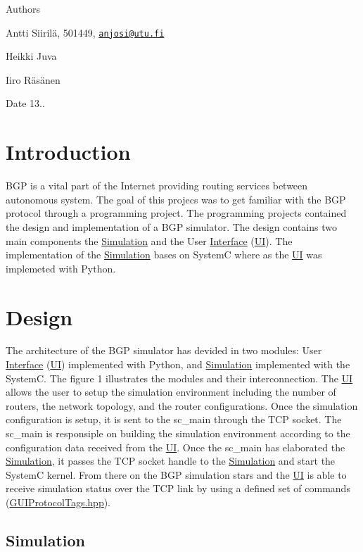 \begin{DoxyAuthor}{Authors}
\begin{DoxyItemize}
\item Antti Siirilä, 501449, \href{mailto:anjosi@utu.fi}{\tt anjosi@utu.\-fi}\item Heikki Juva\item Iiro Räsänen \end{DoxyItemize}

\end{DoxyAuthor}
\begin{DoxyDate}{Date}
13.. 
\end{DoxyDate}
\hypertarget{index_s_intro}{}\section{Introduction}\label{index_s_intro}
B\-G\-P is a vital part of the Internet providing routing services between autonomous system. The goal of this projecs was to get familiar with the B\-G\-P protocol through a programming project. The programming projects contained the design and implementation of a B\-G\-P simulator. The design contains two main components the \hyperlink{classSimulation}{Simulation} and the User \hyperlink{classInterface}{Interface} (\hyperlink{namespaceUI}{U\-I}). The implementation of the \hyperlink{classSimulation}{Simulation} bases on System\-C where as the \hyperlink{namespaceUI}{U\-I} was implemeted with Python. \hypertarget{index_s_design}{}\section{Design}\label{index_s_design}
The architecture of the B\-G\-P simulator has devided in two modules\-: User \hyperlink{classInterface}{Interface} (\hyperlink{namespaceUI}{U\-I}) implemented with Python, and \hyperlink{classSimulation}{Simulation} implemented with the System\-C. The figure 1 illustrates the modules and their interconnection.  The \hyperlink{namespaceUI}{U\-I} allows the user to setup the simulation environment including the number of routers, the network topology, and the router configurations. Once the simulation configuration is setup, it is sent to the sc\-\_\-main through the T\-C\-P socket. The sc\-\_\-main is responsiple on building the simulation environment according to the configuration data received from the \hyperlink{namespaceUI}{U\-I}. Once the sc\-\_\-main has elaborated the \hyperlink{classSimulation}{Simulation}, it passes the T\-C\-P socket handle to the \hyperlink{classSimulation}{Simulation} and start the System\-C kernel. From there on the B\-G\-P simulation stars and the \hyperlink{namespaceUI}{U\-I} is able to receive simulation status over the T\-C\-P link by using a defined set of commands (\hyperlink{GUIProtocolTags_8hpp}{G\-U\-I\-Protocol\-Tags.\-hpp}). \hypertarget{index_sub_Simulation}{}\subsection{Simulation}\label{index_sub_Simulation}
